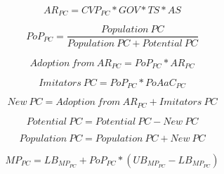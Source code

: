 \begin{equation}
		AR_{PC} = CVP_{PC} * GOV * TS * AS		
\end{equation}

\begin{equation}
	PoP_{PC} = \frac{\mathit{Population~PC}}{\mathit{Population~PC}+\mathit{Potential~PC}}
\end{equation}

\begin{equation}
	\mathit{Adoption~from~AR_{PC}} = PoP_{PC} * AR_{PC}
\end{equation}

\begin{equation}
	\mathit{Imitators~PC} = PoP_{PC} * PoAaC_{PC}
\end{equation}

\begin{equation}
	\mathit{New~PC} = \mathit{Adoption~from~AR_{PC}} + \mathit{Imitators~PC}
\end{equation}

\begin{equation}
	\mathit{Potential~PC} = \mathit{Potential~PC} - \mathit{New~PC}
\end{equation}

\begin{equation}
	\mathit{Population~PC} = \mathit{Population~PC} + \mathit{New~PC}
\end{equation}

\begin{equation}
	MP_{PC} = LB_{MP_{PC}} + PoP_{PC} * (UB_{MP_{PC}} - LB_{MP_{PC}})
\end{equation}
